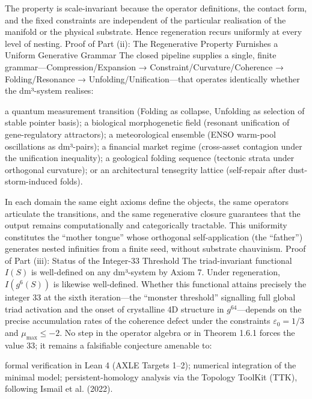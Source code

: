 The property is scale-invariant because the operator definitions, the contact form, and the fixed constraints are independent of the particular realisation of the manifold or the physical substrate. Hence regeneration recurs uniformly at every level of nesting.
Proof of Part (ii): The Regenerative Property Furnishes a Uniform Generative Grammar
The closed pipeline supplies a single, finite grammar—Compression/Expansion → Constraint/Curvature/Coherence → Folding/Resonance → Unfolding/Unification—that operates identically whether the dm³-system realises:

a quantum measurement transition (Folding as collapse, Unfolding as selection of stable pointer basis);
a biological morphogenetic field (resonant unification of gene-regulatory attractors);
a meteorological ensemble (ENSO warm-pool oscillations as dm³-pairs);
a financial market regime (cross-asset contagion under the unification inequality);
a geological folding sequence (tectonic strata under orthogonal curvature); or
an architectural tensegrity lattice (self-repair after dust-storm-induced folds).

In each domain the same eight axioms define the objects, the same operators articulate the transitions, and the same regenerative closure guarantees that the output remains computationally and categorically tractable. This uniformity constitutes the “mother tongue” whose orthogonal self-application (the “father”) generates nested infinities from a finite seed, without substrate chauvinism.
Proof of Part (iii): Status of the Integer-33 Threshold
The triad-invariant functional $  I(S)  $ is well-defined on any dm³-system by Axiom 7. Under regeneration, $  I(g^6(S))  $ is likewise well-defined. Whether this functional attains precisely the integer 33 at the sixth iteration—the “monster threshold” signalling full global triad activation and the onset of crystalline 4D structure in $  g^{64}  $—depends on the precise accumulation rates of the coherence defect under the constraints $  \varepsilon_0 = 1/3  $ and $  \mu_{\max} \le -2  $. No step in the operator algebra or in Theorem 1.6.1 forces the value 33; it remains a falsifiable conjecture amenable to:

formal verification in Lean 4 (AXLE Targets 1–2);
numerical integration of the minimal model;
persistent-homology analysis via the Topology ToolKit (TTK), following Ismail et al. (2022).

